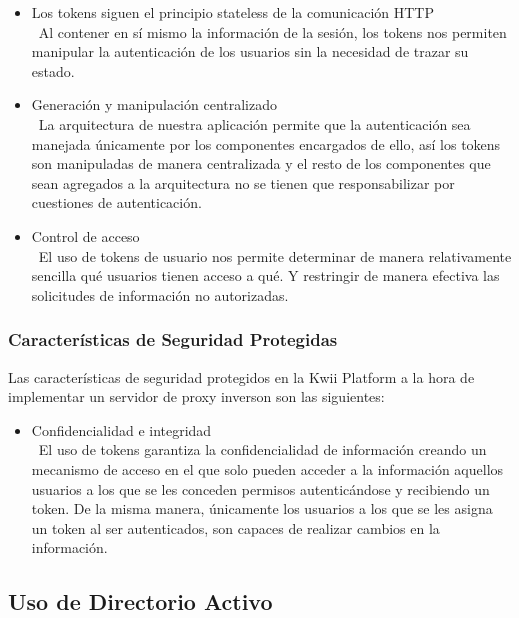 \begin{itemize}
    \item Los tokens siguen el principio stateless de la comunicación HTTP\\\
    Al contener en sí mismo la información de la sesión, los tokens nos permiten manipular la autenticación de los usuarios sin la necesidad de trazar su estado.
    \item Generación y manipulación centralizado\\\
    La arquitectura de nuestra aplicación permite que la autenticación sea manejada únicamente por los componentes encargados de ello, así los tokens son manipuladas de manera centralizada y el resto de los componentes que sean agregados a la arquitectura no se tienen que responsabilizar por cuestiones de autenticación.
    \item Control de acceso\\\
    El uso de tokens de usuario nos permite determinar de manera relativamente sencilla qué usuarios tienen acceso a qué. Y restringir de manera efectiva las solicitudes de información no autorizadas.
\end{itemize}

\subsubsection{Características de Seguridad Protegidas}
Las características de seguridad protegidos en la Kwii Platform a la hora de implementar un servidor de proxy inverson son las siguientes:
\begin{itemize}
    \item Confidencialidad e integridad\\\
    El uso de tokens garantiza la confidencialidad de información creando un mecanismo de acceso en el que solo pueden acceder a la información aquellos usuarios a los que se les conceden permisos autenticándose y recibiendo un token. De la misma manera, únicamente los usuarios a los que se les asigna un token al ser autenticados, son capaces de realizar cambios en la información.
\end{itemize}

\subsection{Uso de Directorio Activo}

